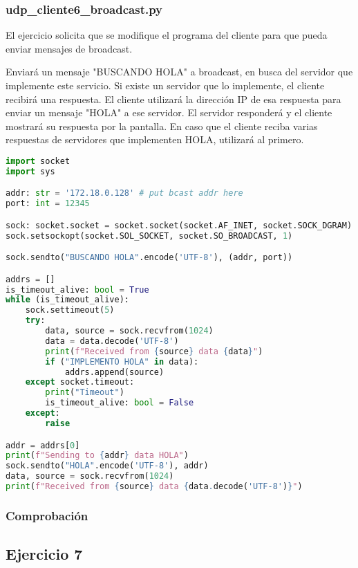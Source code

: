 \subsubsection{udp\_cliente6\_broadcast.py}

El ejercicio solicita que se modifique el programa del cliente para que pueda enviar mensajes
de broadcast.

Enviará un mensaje "BUSCANDO HOLA" a broadcast, en busca del servidor que implemente este servicio.
Si existe un servidor que lo implemente, el cliente recibirá una respuesta.
El cliente utilizará la dirección IP de esa respuesta para enviar un mensaje "HOLA" a ese servidor.
El servidor responderá y el cliente mostrará su respuesta por la pantalla.
En caso que el cliente reciba varias respuestas de servidores que implementen HOLA, utilizará al primero.

\begin{lstlisting}[language=Python]
import socket
import sys

addr: str = '172.18.0.128' # put bcast addr here
port: int = 12345

sock: socket.socket = socket.socket(socket.AF_INET, socket.SOCK_DGRAM)
sock.setsockopt(socket.SOL_SOCKET, socket.SO_BROADCAST, 1)

sock.sendto("BUSCANDO HOLA".encode('UTF-8'), (addr, port))

addrs = []
is_timeout_alive: bool = True
while (is_timeout_alive):
    sock.settimeout(5)
    try:
        data, source = sock.recvfrom(1024)
        data = data.decode('UTF-8')
        print(f"Received from {source} data {data}")
        if ("IMPLEMENTO HOLA" in data):
            addrs.append(source)
    except socket.timeout:
        print("Timeout")
        is_timeout_alive: bool = False
    except:
        raise

addr = addrs[0]
print(f"Sending to {addr} data HOLA")
sock.sendto("HOLA".encode('UTF-8'), addr)
data, source = sock.recvfrom(1024)
print(f"Received from {source} data {data.decode('UTF-8')}")
\end{lstlisting}

\subsubsection{Comprobación}

\subsection{Ejercicio 7}

